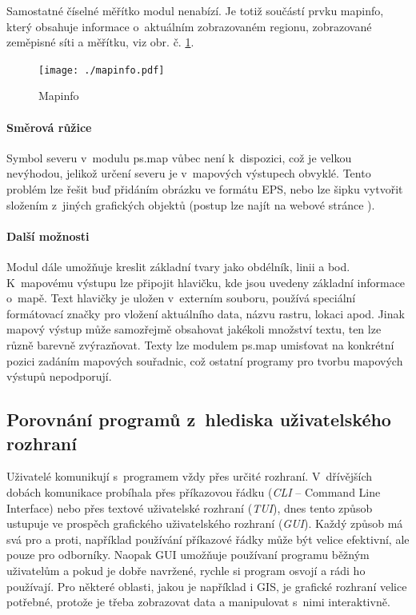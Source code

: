 \documentclass[a4paper,12pt,draft]{article}
\newif\ifbc %
\begin{document}
{Samostatné číselné měřítko modul nenabízí. Je totiž součástí
prvku mapinfo, který obsahuje informace o~aktuálním
zobrazovaném regionu, zobrazované zeměpisné síti a měřítku, viz
obr. č. \ref{fig:mapinfo}. \ifbc Mapinfo nemá v~ostatních programech obdobu,
snad kromě ArcGISu, kde lze podobně zobrazit informace o~souřadnicovém
systému pomocí automaticky generovaného textu (\emph{Dynamic text}).\fi
\begin{figure}[h!]
    \centering
    \texttt{[image: ./mapinfo.pdf]}
    \caption{Mapinfo}
    \label{fig:mapinfo}
\end{figure}

\paragraph*{Směrová růžice}
Symbol severu v~modulu ps.map vůbec není k~dispozici, což je velkou
nevýhodou, jelikož určení severu je v~mapových výstupech obvyklé. Tento
problém lze řešit buď přidáním obrázku ve formátu EPS, nebo
lze šipku vytvořit složením z~jiných grafických objektů (postup lze
najít na webové stránce \cite{wiki_psmap_north}).

\paragraph*{Další možnosti}
Modul dále umožňuje kreslit základní tvary jako obdélník, linii a
bod. K~mapovému výstupu lze připojit hlavičku, kde jsou uvedeny základní
informace o~mapě. Text hlavičky je uložen v~externím souboru, používá
speciální formátovací značky pro vložení aktuálního data, názvu
rastru, lokaci apod. Jinak  mapový výstup může samozřejmě obsahovat
jakékoli množství textu, ten lze různě barevně zvýrazňovat. Texty lze
modulem ps.map umisťovat na konkrétní pozici zadáním mapových
souřadnic, což ostatní programy \ifbc\else pro tvorbu mapových výstupů \fi
nepodporují.
}
\ifbc
\psmapMoznosti


\subsection{Porovnání programů  z~hlediska
uživatelského rozhraní}
Uživatelé komunikují s~programem vždy přes určité rozhraní.
V~dřívějších dobách komunikace probíhala přes příkazovou
řádku (\emph{CLI} -- Command Line Interface) nebo přes textové uživatelské
rozhraní (\emph{TUI}), dnes tento způsob ustupuje ve prospěch grafického
uživatelského
rozhraní (\emph{GUI}). Každý způsob má svá pro a proti, například
používání příkazové řádky může být velice efektivní, ale pouze
pro odborníky. Naopak GUI umožňuje používaní programu běžným
uživatelům a pokud je dobře navržené, rychle si program osvojí a
rádi ho používají. Pro některé oblasti, jakou je například i GIS,
je grafické rozhraní velice potřebné, protože je třeba zobrazovat data
a manipulovat s~nimi interaktivně.
\end{document}

